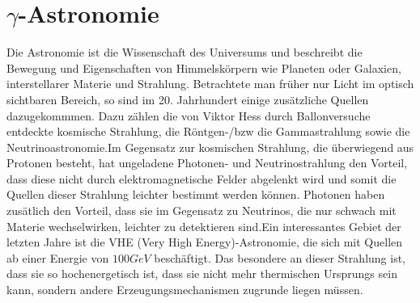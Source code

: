 \chapter{$\gamma$-Astronomie} 
\label{ch:gamma}
Die Astronomie ist die Wissenschaft des Universums und beschreibt die Bewegung und Eigenschaften von Himmelskörpern wie Planeten oder Galaxien, interstellarer Materie und Strahlung. Betrachtete man früher nur Licht im optisch sichtbaren Bereich, so sind im 20. Jahrhundert einige zusätzliche Quellen dazugekommmen. Dazu zählen die von Viktor Hess durch Ballonversuche entdeckte kosmische Strahlung, die Röntgen-/bzw die Gammastrahlung sowie die Neutrinoastronomie.Im Gegensatz zur kosmischen Strahlung, die überwiegend aus Protonen besteht, hat ungeladene Photonen- und Neutrinostrahlung den Vorteil, dass diese nicht durch elektromagnetische Felder abgelenkt wird und somit die Quellen dieser Strahlung leichter bestimmt werden können. Photonen haben zusätlich den Vorteil, dass sie im Gegensatz zu Neutrinos, die nur schwach mit Materie wechselwirken, leichter zu detektieren sind.Ein interessantes Gebiet der letzten Jahre ist die VHE (Very High Energy)-Astronomie, die sich mit Quellen ab einer Energie von $100 \unit{GeV}$ \cite{DesignConcept} beschäftigt. Das besondere an dieser Strahlung ist, dass sie so hochenergetisch ist, dass sie nicht mehr thermischen Ursprungs sein kann, sondern andere Erzeugungsmechanismen zugrunde liegen müssen.


